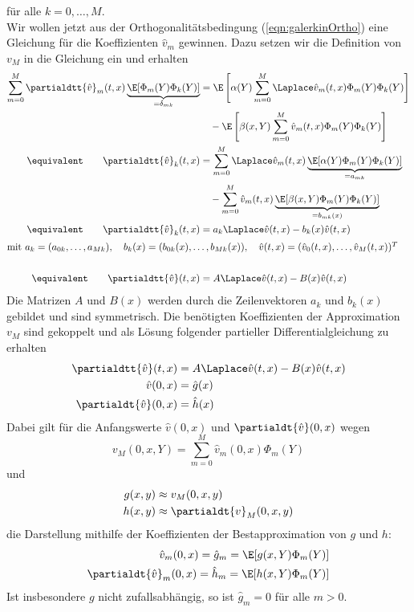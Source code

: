 für alle $k=0,\dots,M$.\\
Wir wollen jetzt aus der Orthogonalitätsbedingung (\ref{eqn:galerkinOrtho}) eine Gleichung für die Koeffizienten $\hat{v}_m$ gewinnen. Dazu setzen wir die Definition von $v_M$ in die Gleichung ein und erhalten
\begin{align*}
\sum_{m=0}^M\partialdtt{\hat{v}}_m(t,x)\underbrace{\E[\Phi_m(Y)\Phi_k(Y)]}_{=\delta_{mk}}&=\E\left[\alpha(Y)\sum_{m=0}^M\Laplace \hat{v}_m(t,x)\Phi_m(Y)\Phi_k(Y)\right]\\
&\quad -\E\left[\beta(x,Y)\sum_{m=0}^M\hat{v}_m(t,x)\Phi_m(Y)\Phi_k(Y)\right]\\
\equivalent \qquad \partialdtt{\hat{v}}_k(t,x)&=\sum_{m=0}^M\Laplace \hat{v}_m(t,x)\underbrace{\E[\alpha(Y)\Phi_m(Y)\Phi_k(Y)]}_{=a_{mk}}\\
&\quad -\sum_{m=0}^M\hat{v}_m(t,x)\underbrace{\E[\beta(x,Y)\Phi_m(Y)\Phi_k(Y)]}_{=b_{mk}(x)}\\
\equivalent \qquad \partialdtt{\hat{v}}_k(t,x)&=a_k\Laplace \hat{v}(t,x)-b_k(x)\hat{v}(t,x)\\
\intertext{mit $ a_k=(a_{0k},\dots,a_{Mk}),\quad b_k(x)=(b_{0k}(x),\dots,b_{Mk}(x)),\quad \hat{v}(t,x)=(\hat{v}_0(t,x),\dots,\hat{v}_M(t,x))^T$}\\
\equivalent \qquad \partialdtt{\hat{v}}(t,x)&=A\Laplace \hat{v}(t,x)-B(x)\hat{v}(t,x)
\end{align*}
Die Matrizen $A$ und $B(x)$ werden durch die Zeilenvektoren $a_k$ und $b_k(x)$ gebildet und sind symmetrisch. Die benötigten Koeffizienten der Approximation $v_M$ sind gekoppelt und als Lösung folgender partieller Differentialgleichung zu erhalten
\begin{equation}
\label{eqn:galerkin_dgl}
\begin{split}
\partialdtt{\hat{v}}(t,x)&=A\Laplace \hat{v}(t,x)-B(x)\hat{v}(t,x)\\
\hat{v}(0,x)&=\hat{g}(x)\\
\partialdt{\hat{v}}(0,x)&=\hat{h}(x)\\
\end{split}
\end{equation}
Dabei gilt für die Anfangswerte $\hat{v}(0,x)$ und $\partialdt{\hat{v}}(0,x)$ wegen 
\[v_M(0,x,Y)=\sum_{m=0}^M\hat{v}_m(0,x)\Phi_m(Y)\]
und
\begin{align*}
g(x,y)&\approx v_M(0,x,y)\\
h(x,y)&\approx \partialdt{v}_M(0,x,y)
\end{align*}
die Darstellung mithilfe der Koeffizienten der Bestapproximation von $g$ und $h$:
\begin{align*}
\hat{v}_m(0,x)=\hat{g}_m=\E[g(x,Y)\Phi_m(Y)]\\
\partialdt{\hat{v}}_m(0,x)=\hat{h}_m=\E[h(x,Y)\Phi_m(Y)]
\end{align*}
Ist insbesondere $g$ nicht zufallsabhängig, so ist $\hat{g}_m=0$ für alle $m>0$.
